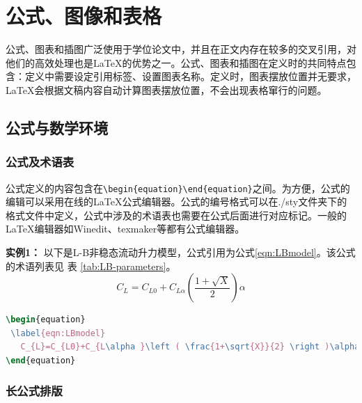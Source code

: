 

\chapter{公式、图像和表格}
\label{chap:example}
公式、图表和插图广泛使用于学位论文中，并且在正文内存在较多的交叉引用，对他们的高效处理也是\LaTeX{}的优势之一。公式、图表和插图在定义时的共同特点包含：定义中需要设定引用标签、设置图表名称。定义时，图表摆放位置并无要求，\LaTeX{}会根据文稿内容自动计算图表摆放位置，不会出现表格窜行的问题。

\section{公式与数学环境}
\label{sec:eqn}

\subsection{公式及术语表}
\label{sec:eqn}

公式定义的内容包含在\verb|\begin{equation}|\verb|\end{equation}|之间。为方便，公式的编辑可以采用在线的\LaTeX{}公式编辑器。公式的编号格式可以在./sty文件夹下的格式文件中定义，公式中涉及的术语表也需要在公式后面进行对应标记。一般的\LaTeX{}编辑器如Winedit、texmaker等都有公式编辑器。

{\bf{实例1：}} 以下是L-B非稳态流动升力模型，公式引用为公式\ref{eqn:LBmodel}。该公式的术语列表见 表 \ref{tab:LB-parameters}。
\begin{equation}
 \label{eqn:LBmodel}
   C_{L}=C_{L0}+C_{L\alpha }\left ( \frac{1+\sqrt{X}}{2} \right )\alpha 
\end{equation}

\begin{lstlisting}[language={TeX}, caption={L-B非稳态流动升力模型}]
\begin{equation}
 \label{eqn:LBmodel}
   C_{L}=C_{L0}+C_{L\alpha }\left ( \frac{1+\sqrt{X}}{2} \right )\alpha 
\end{equation}
\end{lstlisting}

\subsection{长公式排版}


